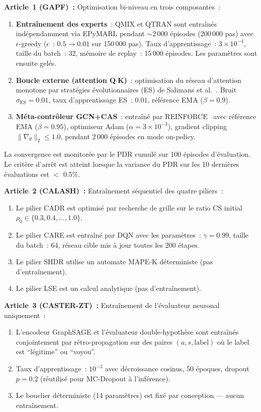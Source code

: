 \textbf{Article~1 (GAPF)~:} Optimisation bi-niveau en trois composantes~:
\begin{enumerate}
    \item \textbf{Entraînement des experts}~: QMIX et QTRAN sont entraînés indépendamment via EPyMARL pendant ${\sim}2\,000$ épisodes (200\,000 pas) avec $\epsilon$-greedy ($\epsilon$~: $0.5 \to 0.01$ sur 150\,000 pas). Taux d'apprentissage~: $3 \times 10^{-4}$, taille du batch~: 32, mémoire de replay~: 15\,000 épisodes. Les paramètres sont ensuite gelés.
    \item \textbf{Boucle externe (attention Q$\cdot$K)}~: optimisation du réseau d'attention monotone par stratégies évolutionnaires (ES) de Salimans et al.\ \cite{salimans2017evolution}. Bruit $\sigma_{\text{ES}} = 0.01$, taux d'apprentissage ES~: $0.01$, référence EMA ($\beta = 0.9$).
    \item \textbf{Méta-contrôleur GCN+CAS}~: entraîné par REINFORCE~\cite{williams1992simple} avec référence EMA ($\beta = 0.95$), optimiseur Adam ($\alpha = 3 \times 10^{-3}$), gradient clipping $\|\nabla_\theta\|_2 \leq 1.0$, pendant 2\,000 épisodes en mode on-policy.
\end{enumerate}
La convergence est monitorée par le PDR cumulé sur 100 épisodes d'évaluation. Le critère d'arrêt est atteint lorsque la variance du PDR sur les 10 dernières évaluations est $<$ 0.5\%.

\textbf{Article~2 (CALASH)~:} Entraînement séquentiel des quatre piliers~:
\begin{enumerate}
    \item Le pilier CADR est optimisé par recherche de grille sur le ratio CS initial $\rho_0 \in \{0.3, 0.4, \ldots, 1.0\}$.
    \item Le pilier CARE est entraîné par DQN avec les paramètres~: $\gamma = 0.99$, taille du batch~: 64, réseau cible mis à jour toutes les 200 étapes.
    \item Le pilier SHDR utilise un automate MAPE-K déterministe (pas d'entraînement).
    \item Le pilier LSE est un calcul analytique (pas d'entraînement).
\end{enumerate}

\textbf{Article~3 (CASTER-ZT)~:} Entraînement de l'évaluateur neuronal uniquement~:
\begin{enumerate}
    \item L'encodeur GraphSAGE et l'évaluateur double-hypothèse sont entraînés conjointement par rétro-propagation sur des paires $(a, s, \text{label})$ où le label est ``légitime'' ou ``voyou''.
    \item Taux d'apprentissage~: $10^{-3}$ avec décroissance cosinus, 50 époques, dropout $p = 0.2$ (réutilisé pour MC-Dropout à l'inférence).
    \item Le bouclier déterministe (14 paramètres) est fixé par conception --- aucun entraînement.
\end{enumerate}

